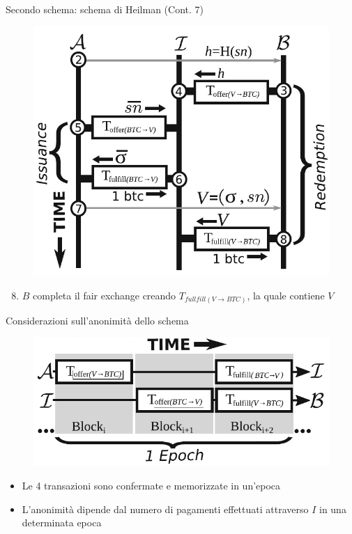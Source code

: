 \documentclass{beamer}
\begin{document}
  
  
  
  \begin{frame}{Secondo schema: schema di Heilman (Cont. 7)}
      \begin{figure}
          \centering
          \includegraphics[width=0.4\linewidth]{../img/heilman-scheme.png}
      \end{figure}
      
      \begin{enumerate}
      \setcounter{enumi}{7}
          \item $B$ completa il fair exchange creando $T_{fullfill(V\rightarrow BTC)}$, la quale contiene $V$
      \end{enumerate}
  \end{frame}
  
  
  
  \begin{frame}{Considerazioni sull'anonimità dello schema}
      \begin{figure}
          \centering
          \includegraphics[width=0.4\linewidth]{../img/epochs.png}
      \end{figure}
      \begin{itemize}
          \item Le 4 transazioni sono confermate e memorizzate in un'epoca
          \item L'anonimità dipende dal numero di pagamenti effettuati attraverso $I$ in una determinata epoca
      \end{itemize}
  \end{frame}
  
  
  
\end{document}
